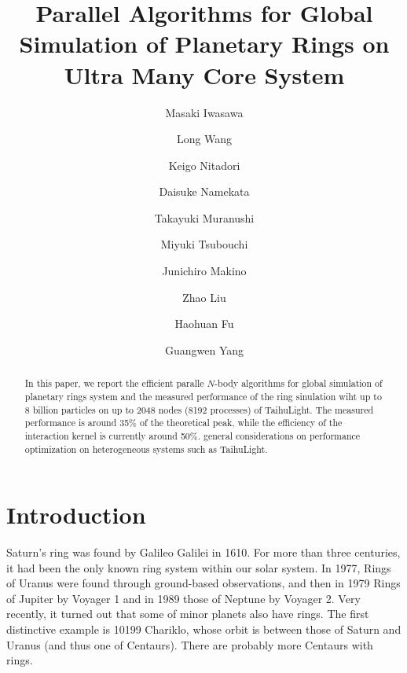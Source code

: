 \documentclass[oribibl]{llncs}
\begin{document}
\title{Parallel Algorithms for Global Simulation of Planetary Rings on
  Ultra Many Core System}

\author{Masaki Iwasawa  \and Long Wang  \and Keigo
  Nitadori  \and Daisuke Namekata  \and Takayuki
  Muranushi  \and Miyuki Tsubouchi  \and Junichiro
  Makino  \and Zhao Liu  \and Haohuan Fu
   \and Guangwen Yang }


\maketitle

\begin{abstract}

In this paper, we report the efficient paralle $N$-body algorithms for
global simulation of planetary rings system and the measured
performance of the ring sinulation wiht up to 8 billion particles on
up to 2048 nodes (8192 processes) of TaihuLight. The measured
performance is around 35\% of the theoretical peak, while the
efficiency of the interaction kernel is currently around 50\%.
general considerations on performance optimization on heterogeneous
systems such as TaihuLight.

\end{abstract}

\section{Introduction}
\label{sect:intro}

Saturn's ring was found by Galileo Galilei in 1610. For more than
three centuries, it had been the only known ring system within our
solar system. In 1977, Rings of Uranus were found through ground-based
observations, and then in 1979 Rings of Jupiter by Voyager 1 and in
1989 those of Neptune by Voyager 2.  Very recently, it turned out that
some of minor planets also have rings. The first distinctive example
is 10199 Chariklo, whose orbit is between those of Saturn and Uranus
(and thus one of Centaurs). There are probably more Centaurs with
rings.
\end{document}
